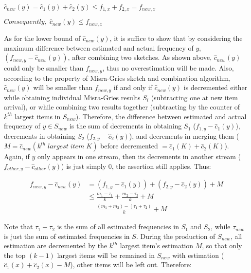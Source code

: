 \documentclass[12pt]{article}
\begin{document}
\begin{center}
$\hat{c}_{new}(y) = \hat{c}_{1}(y) + \hat{c}_{2}(y) \leq f_{1,x} + f_{2,x} = f_{new,x}$
\end{center}

\begin{center}
$Consequently, \; \hat{c}_{new}(y) \leq f_{new,x}$
\end{center}

As for the lower bound of $\hat{c}_{new}(y)$, it is suffice to show that by considering the maximum difference between estimated and actual frequency of $y$, $(f_{new,y} - \hat{c}_{new}(y))$, after combining two sketches. As shown above, $\hat{c}_{new}(y)$ could only be smaller than $f_{new,y}$, thus no overestimation will be made. Also, according to the property of Misra-Gries sketch and combination algorithm,  $\hat{c}_{new}(y)$ will be smaller than $f_{new,y}$ if and only if $\hat{c}_{new}(y)$ is decremented either while obtaining individual Misra-Gries results $S_i$ (subtracting one at new item arrival), or while combining two results together (subtracting by the counter of $k^{th}$ largest items in $S_{new}$). Therefore, the difference between estimated and actual frequency of $y \in S_{new}$ is the sum of decrements in obtaining $S_1$ ($f_{1,y} - \hat{c}_{1}(y)$), decrements in obtaining $S_2$ ($f_{2,y} - \hat{c}_{2}(y)$), and decrements in merging them ($M = \hat{c}_{new}(k^{th} \; largest \; item \; K)$ before decremented $= \hat{c}_{1}(K) + \hat{c}_{2}(K)$). Again, if $y$ only appears in one stream, then its decrements in another stream ($f_{other,y} - \hat{c}_{other}(y)$) is just simply 0, the assertion still applies. Thus:

\begin{equation}
\begin{aligned}
f_{new,y} - \hat{c}_{new}(y) &= (f_{1,y} - \hat{c}_{1}(y)) + (f_{2,y} - \hat{c}_{2}(y)) + M \\
&\leq \frac{m_1 - \tau_1}{k} + \frac{m_2 - \tau_2}{k} + M \\
&= \frac{(m_1 + m_2) - (\tau_1 + \tau_2)}{k} + M
\end{aligned}
\end{equation}

Note that $\tau_1 + \tau_2$ is the sum of all estimated frequencies in $S_1$ and $S_2$, while $\tau_{new}$ is just the sum of estimated frequencies in $S$. During the production of $S_{new}$, all estimation are decremented by the $k^{th}$ largest item's estimation $M$, so that only the top $(k-1)$ largest items will be remained in $S_{new}$ with estimation ($\hat{c}_{1}(x) + \hat{c}_{2}(x) - M$), other items will be left out. Therefore:
\end{document}
